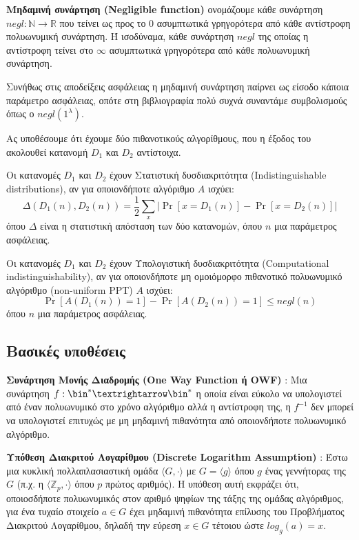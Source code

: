 \begin{definition}
\textbf{Μηδαμινή συνάρτηση (Negligible function)} ονομάζουμε κάθε συνάρτηση $negl: \mathbb{N} \rightarrow \mathbb{R}$ που τείνει ως προς το $0$ ασυμπτωτικά γρηγορότερα από κάθε αντίστροφη πολυωνυμική συνάρτηση. Ή ισοδύναμα, κάθε συνάρτηση $negl$ της οποίας η αντίστροφη τείνει στο $\infty$ ασυμπτωτικά γρηγορότερα από κάθε πολυωνυμική συνάρτηση.
\end{definition}
Συνήθως στις αποδείξεις ασφάλειας η μηδαμινή συνάρτηση παίρνει ως είσοδο κάποια παράμετρο ασφάλειας, οπότε στη βιβλιογραφία πολύ συχνά συναντάμε συμβολισμούς όπως ο $negl(1^λ)$.

Ας υποθέσουμε ότι έχουμε δύο πιθανοτικούς αλγορίθμους, που η έξοδος του ακολουθεί κατανομή $D_1$ και $D_2$ αντίστοιχα. 
\begin{definition}
Οι κατανομές $D_1$ και $D_2$ έχουν Στατιστική δυσδιακριτότητα (Indistinguishable distributions), αν για οποιονδήποτε αλγόριθμο $A$ ισχύει:
$$
\Delta\left(D_{1}(n), D_{2}(n)\right)=\frac{1}{2} \sum_{x}\left|\operatorname{Pr}\left[x=D_{1}(n)\right]-\operatorname{Pr}\left[x=D_{2}(n)\right]\right|
$$
όπου $Δ$ είναι η στατιστική απόσταση των δύο κατανομών, όπου $n$ μια παράμετρος ασφάλειας.
\end{definition}

\begin{definition}
Οι κατανομές $D_1$ και $D_2$ έχουν Υπολογιστική δυσδιακριτότητα (Computational indistinguishability), αν για οποιονδήποτε μη ομοιόμορφο πιθανοτικό πολυωνυμικό αλγόριθμο (non-uniform PPT) $A$ ισχύει:
$$
\operatorname{Pr}\left[A\left(D_{1}(n)\right)=1\right]-\operatorname{Pr}\left[A\left(D_{2}(n)\right)=1\right] \leq negl(n)
$$
όπου $n$ μια παράμετρος ασφάλειας.
\end{definition}

\subsection{Βασικές υποθέσεις}

\begin{definition}
\textbf{Συνάρτηση Μονής Διαδρομής (One Way Function ή OWF)} : Μια συνάρτηση  $f : \bin^{*} → \bin^{*}$ η οποία είναι εύκολο να υπολογιστεί από έναν πολυωνυμικό στο χρόνο αλγόριθμο αλλά η αντίστροφη της, η $f^{-1}$ δεν μπορεί να υπολογιστεί επιτυχώς με μη μηδαμινή πιθανότητα από οποιονδήποτε πολυωνυμικό αλγόριθμο.
\end{definition}

\begin{definition}
\textbf{Υπόθεση Διακριτού Λογαρίθμου (Discrete Logarithm Assumption)} : Έστω μια κυκλική πολλαπλασιαστική ομάδα $\langle G, \cdot \rangle$  με $G = \langle g \rangle$ όπου $g$ ένας γεννήτορας της $G$ (π.χ. η $\langle \mathbb{Z}_p, \cdot \rangle$ όπου  $p$ πρώτος αριθμός). Η υπόθεση αυτή εκφράζει ότι, οποιοσδήποτε πολυωνυμικός στον αριθμό ψηφίων της τάξης της ομάδας αλγόριθμος, για ένα τυχαίο στοιχείο $a \in G$ έχει μηδαμινή πιθανότητα επίλυσης του Προβλήματος Διακριτού Λογαρίθμου, δηλαδή την εύρεση $x \in G$ τέτοιου ώστε $log_g(a) = x$.
\end{definition}

